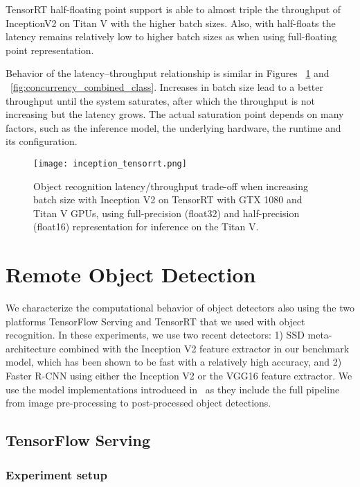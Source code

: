 \documentclass[sigconf]{acmart}
\begin{document}
TensorRT half-floating point support is able to almost triple the throughput of InceptionV2 on Titan V with the higher batch sizes. Also, with half-floats the latency remains relatively low to higher batch sizes as when using full-floating point representation.

Behavior of the latency--throughput relationship is similar in Figures ~\ref{fig:inception_tensorrt} and ~\ref{fig:concurrency_combined_class}. Increases in batch size lead to a better throughput until the system saturates, after which the throughput is not increasing but the latency grows. The actual saturation point depends on many factors, such as the inference model, the underlying hardware, the runtime and its configuration. 

\begin{figure}[t]
\centering
\texttt{[image: inception\_tensorrt.png]}
\caption{Object recognition latency/throughput trade-off when increasing batch size with Inception V2 on TensorRT with GTX 1080 and Titan V GPUs, using full-precision (float32) and half-precision (float16) representation for inference on the Titan V.}
\label{fig:inception_tensorrt}
\end{figure}

\section{Remote Object Detection}\label{sec:detection}We characterize the computational behavior of object detectors also using the two platforms TensorFlow Serving and TensorRT that we used with object recognition. 
In these experiments, we use two recent detectors: 1) SSD meta-architecture combined with the Inception V2 feature extractor in our benchmark model, which has been shown to be fast with a relatively high accuracy, and 2) Faster R-CNN using either the Inception V2 or the VGG16 feature extractor.
We use the model implementations introduced in~\cite{Huang2017CVPR} as they include the full pipeline from image pre-processing to post-processed object detections.

\subsection{TensorFlow Serving}\label{sec:TF_serving}\subsubsection{Experiment setup}
\end{document}
